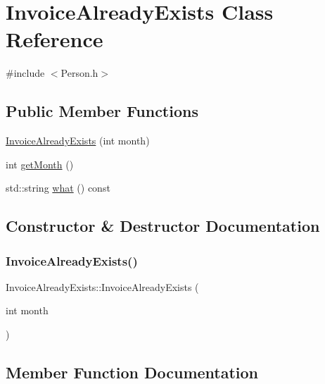 \hypertarget{class_invoice_already_exists}{}\section{Invoice\+Already\+Exists Class Reference}
\label{class_invoice_already_exists}


{\ttfamily \#include $<$Person.\+h$>$}

\subsection*{Public Member Functions}
\begin{DoxyCompactItemize}
\item 
\mbox{\hyperlink{class_invoice_already_exists_ae5d642f496997633c4a4dbc3c8347374}{Invoice\+Already\+Exists}} (int month)
\item 
int \mbox{\hyperlink{class_invoice_already_exists_a75da257c1dfbaa7cacf89e79c759eb43}{get\+Month}} ()
\item 
std\+::string \mbox{\hyperlink{class_invoice_already_exists_ae0239e7ba5445491a3182d77d34b1505}{what}} () const
\end{DoxyCompactItemize}


\subsection{Constructor \& Destructor Documentation}
\mbox{\label{class_invoice_already_exists_ae5d642f496997633c4a4dbc3c8347374}} 
\subsubsection{\texorpdfstring{Invoice\+Already\+Exists()}{InvoiceAlreadyExists()}}
{\footnotesize\ttfamily Invoice\+Already\+Exists\+::\+Invoice\+Already\+Exists (\begin{DoxyParamCaption}\item[{int}]{month }\end{DoxyParamCaption})\hspace{0.3cm}{\ttfamily [inline]}}



\subsection{Member Function Documentation}
\mbox{\label{class_invoice_already_exists_a75da257c1dfbaa7cacf89e79c759eb43}} 
